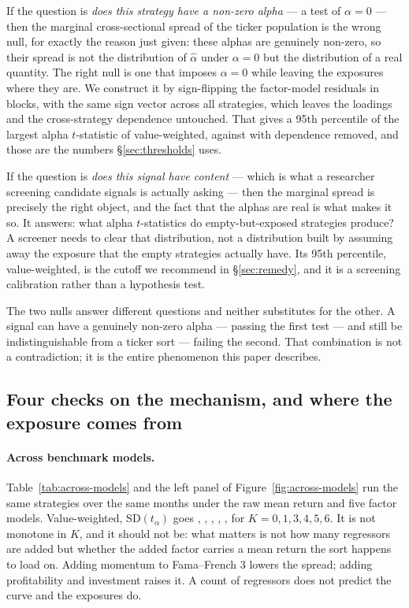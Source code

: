 \documentclass{article}
\begin{document}
If the question is \emph{does this strategy have a non-zero alpha} --- a test of
$\alpha = 0$ --- then the marginal cross-sectional spread of the ticker
population is the wrong null, for exactly the reason just given: these alphas
are genuinely non-zero, so their spread is not the distribution of $\hat\alpha$
under $\alpha = 0$ but the distribution of a real quantity. The right null is
one that imposes $\alpha = 0$ while leaving the exposures where they are. We
construct it by sign-flipping the factor-model residuals in blocks, with the
same sign vector across all strategies, which leaves the loadings and the
cross-strategy dependence untouched. That gives a 95th percentile of the largest
alpha $t$-statistic of \bzooffMaxTJointVw{} value-weighted, against
\bzooffMaxTIndepVw{} with dependence removed, and those are the numbers
\S\ref{sec:thresholds} uses.

If the question is \emph{does this signal have content} --- which is what a
researcher screening candidate signals is actually asking --- then the marginal
spread is precisely the right object, and the fact that the alphas are real is
what makes it so. It answers: what alpha $t$-statistics do empty-but-exposed
strategies produce? A screener needs to clear that distribution, not a
distribution built by assuming away the exposure that the empty strategies
actually have. Its 95th percentile, \bzooamCutoffFfFiveVw{} value-weighted, is
the cutoff we recommend in \S\ref{sec:remedy}, and it is a screening
calibration rather than a hypothesis test.

The two nulls answer different questions and neither substitutes for the other.
A signal can have a genuinely non-zero alpha --- passing the first test --- and
still be indistinguishable from a ticker sort --- failing the second. That
combination is not a contradiction; it is the entire phenomenon this paper
describes.

\subsection{Four checks on the mechanism, and where the exposure comes from}
\label{sec:mechanism}



\paragraph{Across benchmark models.}
Table~\ref{tab:across-models} and the left panel of
Figure~\ref{fig:across-models} run the same strategies over the same months
under the raw mean return and five factor models. Value-weighted,
SD$(t_\alpha)$ goes
\bzooamSdRawVw{}, \bzooamSdCapmVw{}, \bzooamSdFfThreeVw{},
\bzooamSdCarhartVw{}, \bzooamSdFfFiveVw{}, \bzooamSdFfSixVw{} for
$K = 0,1,3,4,5,6$. It is not monotone in $K$, and it should not be: what
matters is not how many regressors are added but whether the added factor
carries a mean return the sort happens to load on. Adding momentum to
Fama--French 3 lowers the spread; adding profitability and investment raises
it. A count of regressors does not predict the curve and the exposures do.
\end{document}
